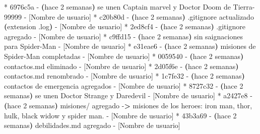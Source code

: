 \documentclass[
]{book}
\newenvironment{Shaded}{\begin{snugshade}}{\end{snugshade}}
\newcommand{\AttributeTok}[1]{\textcolor[rgb]{0.13,0.29,0.53}{#1}}
\newcommand{\ErrorTok}[1]{\textcolor[rgb]{0.64,0.00,0.00}{\textbf{#1}}}
\newcommand{\ExtensionTok}[1]{#1}
\newcommand{\KeywordTok}[1]{\textcolor[rgb]{0.13,0.29,0.53}{\textbf{#1}}}
\newcommand{\NormalTok}[1]{#1}
\newcommand{\OperatorTok}[1]{\textcolor[rgb]{0.81,0.36,0.00}{\textbf{#1}}}
\begin{document}
\begin{Shaded}
\begin{Highlighting}[]
\ExtensionTok{*}\NormalTok{ 6976c5a }\AttributeTok{{-}} \ErrorTok{(}\ExtensionTok{hace}\NormalTok{ 2 semanas}\KeywordTok{)} \ExtensionTok{se}\NormalTok{ unen Captain marvel y Doctor Doom de Tierra{-}99999 }\AttributeTok{{-}}\NormalTok{ [Nombre de usuario]}
\ExtensionTok{*}\NormalTok{ c20b80d }\AttributeTok{{-}} \ErrorTok{(}\ExtensionTok{hace}\NormalTok{ 2 semanas}\KeywordTok{)} \ExtensionTok{.gitignore}\NormalTok{ actualizado }\ErrorTok{(}\ExtensionTok{extension}\NormalTok{ .log}\KeywordTok{)} \ExtensionTok{{-}}\NormalTok{ [Nombre de usuario]}
\ExtensionTok{*}\NormalTok{ 2ed8cf4 }\AttributeTok{{-}} \ErrorTok{(}\ExtensionTok{hace}\NormalTok{ 2 semanas}\KeywordTok{)} \ExtensionTok{.gitignore}\NormalTok{ agregado }\AttributeTok{{-}}\NormalTok{ [Nombre de usuario]}
\ExtensionTok{*}\NormalTok{ c9ffd15 }\AttributeTok{{-}} \ErrorTok{(}\ExtensionTok{hace}\NormalTok{ 2 semanas}\KeywordTok{)} \ExtensionTok{sin}\NormalTok{ saignaciones para Spider{-}Man }\AttributeTok{{-}}\NormalTok{ [Nombre de usuario]}
\ExtensionTok{*}\NormalTok{ e31eae6 }\AttributeTok{{-}} \ErrorTok{(}\ExtensionTok{hace}\NormalTok{ 2 semanas}\KeywordTok{)} \ExtensionTok{misiones}\NormalTok{ de Spider{-}Man completadas }\AttributeTok{{-}}\NormalTok{ [Nombre de usuario]}
\ExtensionTok{*}\NormalTok{ 0059540 }\AttributeTok{{-}} \ErrorTok{(}\ExtensionTok{hace}\NormalTok{ 2 semanas}\KeywordTok{)} \ExtensionTok{contactos.md}\NormalTok{ eliminado }\AttributeTok{{-}}\NormalTok{ [Nombre de usuario]}
\ExtensionTok{*}\NormalTok{ 2d05f6e }\AttributeTok{{-}} \ErrorTok{(}\ExtensionTok{hace}\NormalTok{ 2 semanas}\KeywordTok{)} \ExtensionTok{contactos.md}\NormalTok{ renombrado }\AttributeTok{{-}}\NormalTok{ [Nombre de usuario]}
\ExtensionTok{*}\NormalTok{ 1c7fe32 }\AttributeTok{{-}} \ErrorTok{(}\ExtensionTok{hace}\NormalTok{ 2 semanas}\KeywordTok{)} \ExtensionTok{contactos}\NormalTok{ de emergencia agregados }\AttributeTok{{-}}\NormalTok{ [Nombre de usuario]}
\ExtensionTok{*}\NormalTok{ 8727c32 }\AttributeTok{{-}} \ErrorTok{(}\ExtensionTok{hace}\NormalTok{ 2 semanas}\KeywordTok{)} \ExtensionTok{se}\NormalTok{ unen Doctor Strange y Daredevil }\AttributeTok{{-}}\NormalTok{ [Nombre de usuario]}
\ExtensionTok{*}\NormalTok{ a2427e8 }\AttributeTok{{-}} \ErrorTok{(}\ExtensionTok{hace}\NormalTok{ 2 semanas}\KeywordTok{)} \ExtensionTok{misiones/}\NormalTok{ agregado }\AttributeTok{{-}}\OperatorTok{\textgreater{}}\NormalTok{ misiones de los heroes: iron man, thor, hulk, black widow y spider man. }\AttributeTok{{-}}\NormalTok{ [Nombre de usuario]}
\ExtensionTok{*}\NormalTok{ 43b3a69 }\AttributeTok{{-}} \ErrorTok{(}\ExtensionTok{hace}\NormalTok{ 2 semanas}\KeywordTok{)} \ExtensionTok{debilidades.md}\NormalTok{ agregado }\AttributeTok{{-}}\NormalTok{ [Nombre de usuario]}

\end{Highlighting}
\end{Shaded}
\end{document}
